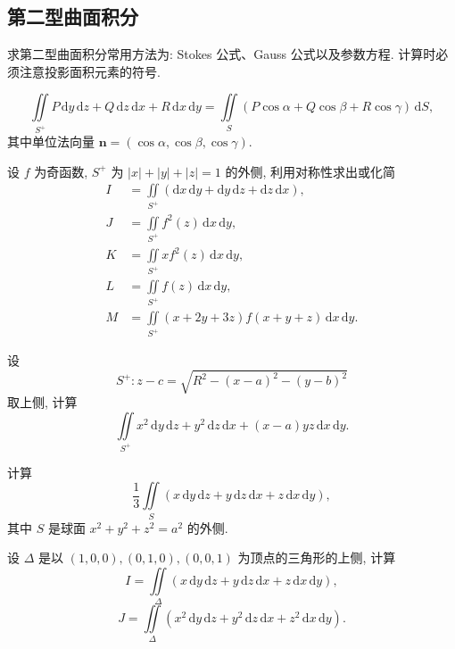 \documentclass[../数学分析培优讲义.tex]{subfiles}
\begin{document}
\newpage

\subsection{第二型曲面积分}

求第二型曲面积分常用方法为: Stokes 公式、Gauss 公式以及参数方程. 计算时必须注意投影面积元素的符号.

\begin{theorem}[\markstar]
\[
    \iint\limits_{S^+}P\,\mathrm{d}y\,\mathrm{d}z+Q\,\mathrm{d}z\,\mathrm{d}x+R\,\mathrm{d}x\,\mathrm{d}y
    =\iint\limits_S(P\cos\alpha+Q\cos\beta+R\cos\gamma)\,\mathrm{d}S,
\]
其中单位法向量 $\bm n=(\cos\alpha,\cos\beta,\cos\gamma)$.
\end{theorem}

\begin{example}
设 $f$ 为奇函数, $S^+$ 为 $|x|+|y|+|z|=1$ 的外侧, 利用对称性求出或化简
\[
\begin{aligned}
    I&=\iint\limits_{S^+}(\mathrm{d}x\,\mathrm{d}y+\mathrm{d}y\,\mathrm{d}z+\mathrm{d}z\,\mathrm{d}x),\\
    J&=\iint\limits_{S^+}f^2(z)\,\mathrm{d}x\,\mathrm{d}y,\\
    K&=\iint\limits_{S^+}xf^2(z)\,\mathrm{d}x\,\mathrm{d}y,\\
    L&=\iint\limits_{S^+}f(z)\,\mathrm{d}x\,\mathrm{d}y,\\
    M&=\iint\limits_{S^+}(x+2y+3z)f(x+y+z)\,\mathrm{d}x\,\mathrm{d}y.
\end{aligned}
\]
\end{example}
\exampleblank

\begin{example}
设
\[
    S^+:z-c=\sqrt{R^2-(x-a)^2-(y-b)^2}
\]
取上侧, 计算
\[
    \iint\limits_{S^+}x^2\,\mathrm{d}y\,\mathrm{d}z+y^2\,\mathrm{d}z\,\mathrm{d}x+(x-a)y z\,\mathrm{d}x\,\mathrm{d}y.
\]
\end{example}
\exampleblank

\begin{example}
计算
\[
    \dfrac{1}{3}\iint\limits_S(x\,\mathrm{d}y\,\mathrm{d}z+y\,\mathrm{d}z\,\mathrm{d}x+z\,\mathrm{d}x\,\mathrm{d}y),
\]
其中 $S$ 是球面 $x^2+y^2+z^2=a^2$ 的外侧.
\end{example}
\exampleblank

\begin{example}
设 $\Delta$ 是以 $(1,0,0),(0,1,0),(0,0,1)$ 为顶点的三角形的上侧, 计算
\[
    I=\iint\limits_\Delta(x\,\mathrm{d}y\,\mathrm{d}z+y\,\mathrm{d}z\,\mathrm{d}x+z\,\mathrm{d}x\,\mathrm{d}y),
\]
\[
    J=\iint\limits_\Delta(x^2\,\mathrm{d}y\,\mathrm{d}z+y^2\,\mathrm{d}z\,\mathrm{d}x+z^2\,\mathrm{d}x\,\mathrm{d}y).
\]
\end{example}
\exampleblank
\end{document}
